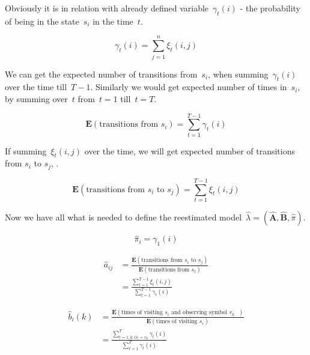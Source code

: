 \documentclass[thesis=M,english]{FITthesis}[2012/10/20]
\newcommand{\matr}[1]{\mathbf{#1}}
\begin{document}
Obviously it is in relation with already defined variable~$\gamma_t(i)$ - the probability of being in the state~$s_i$ in the time~$t$.

\begin{equation}
\gamma_t(i) = \sum_{j=1}^n \xi_t(i,j)  
\end{equation}

We can get the expected number of transitions from~$s_i$, when summing~$\gamma_t(i)$ over the time till~$T-1$. Similarly we would get expected number of times in~$s_i$, by summing over~$t$ from~$t=1$ till~$t=T$. 

\begin{equation}
\mathbf{E}(\text{transitions from $s_i$}) = \sum_{t=1}^{T-1} \gamma_t(i)  
\end{equation}

If summing~$\xi_t(i,j)$ over the time, we will get expected number of transitions from $s_i$ to $s_j$, . 

\begin{equation}
\mathbf{E}(\text{transitions from $s_i$ to $s_j$}) = \sum_{t=1}^{T-1} \xi_t(i,j)  
\end{equation}

Now we have all what is needed to define the reestimated model~$\hat\lambda=(\hat{\matr{A}},\hat{\matr{B}},\hat\pi)$.

\begin{equation}\label{eq:bwpi}
\hat\pi_i = \gamma_1(i)  
\end{equation}

\begin{equation}\label{eq:bwa}
\begin{aligned}
\hat a_{ij} &= \frac{\mathbf{E}(\text{transitions from $s_i$ to $s_j$})}
				   {\mathbf{E}(\text{transitions from $s_i$})}  \\
		    &= \frac{\sum\limits_{t=1}^{T-1} \xi_t(i,j)}{\sum\limits_{t=1}^{T-1} \gamma_t(i) }
\end{aligned}
\end{equation}

\begin{equation}\label{eq:bwb}
\begin{aligned}
\hat b_{i}(k) &= \frac{\mathbf{E}(\text{times of visiting $s_i$ and observing symbol $v_k$ })}
				   {\mathbf{E}(\text{times of visiting $s_i$})} \\
			  &= \frac{\sum\limits_{t=1, \text{if } O_t = v_k  }^{T} \gamma_t(i)}{\sum\limits_{t=1}^{T} \gamma_t(i) } 
\end{aligned}
\end{equation}
\end{document}
